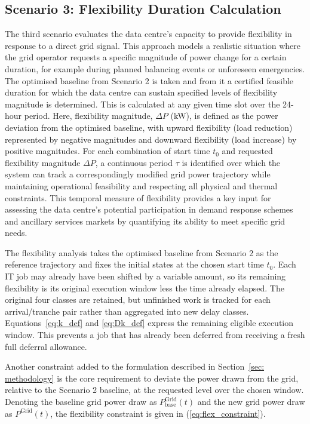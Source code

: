 \documentclass[lettersize,journal]{IEEEtran}
\begin{document}
\subsection{Scenario 3: Flexibility Duration Calculation}\label{sec:scenario 3}
The third scenario evaluates the data centre's capacity to provide flexibility in response to a direct grid signal. This approach models a realistic situation where the grid operator requests a specific magnitude of power change for a certain duration, for example during planned balancing events or unforeseen emergencies. The optimised baseline from Scenario 2 is taken and from it a certified feasible duration for which the data centre can sustain specified levels of flexibility magnitude is determined. This is calculated at any given time slot over the 24-hour period. Here, flexibility magnitude, $\Delta P$ (kW), is defined as the power deviation from the optimised baseline, with upward flexibility (load reduction) represented by negative magnitudes and downward flexibility (load increase) by positive magnitudes. For each combination of start time $t_0$ and requested flexibility magnitude $\Delta P$, a continuous period $\tau$ is identified over which the system can track a correspondingly modified grid power trajectory while maintaining operational feasibility and respecting all physical and thermal constraints. This temporal measure of flexibility provides a key input for assessing the data centre's potential participation in demand response schemes and ancillary services markets by quantifying its ability to meet specific grid needs.

The flexibility analysis takes the optimised baseline from Scenario 2 as the reference trajectory and fixes the initial states at the chosen start time $t_0$. Each IT job may already have been shifted by a variable amount, so its remaining flexibility is its original execution window less the time already elapsed. The original four classes are retained, but unfinished work is tracked for each arrival/tranche pair rather than aggregated into new delay classes. Equations~\eqref{eq:k_def} and \eqref{eq:Dk_def} express the remaining eligible execution window. This prevents a job that has already been deferred from receiving a fresh full deferral allowance.

Another constraint added to the formulation described in Section~\ref{sec: methodology} is the core requirement to deviate the power drawn from the grid, relative to the Scenario 2 baseline, at the requested level over the chosen window. Denoting the baseline grid power draw as $P^{\mathrm{Grid}}_{\mathrm{base}}(t)$ and the new grid power draw as $P^{\mathrm{Grid}}(t)$, the flexibility constraint is given in (\ref{eq:flex_constraint}).
\end{document}
